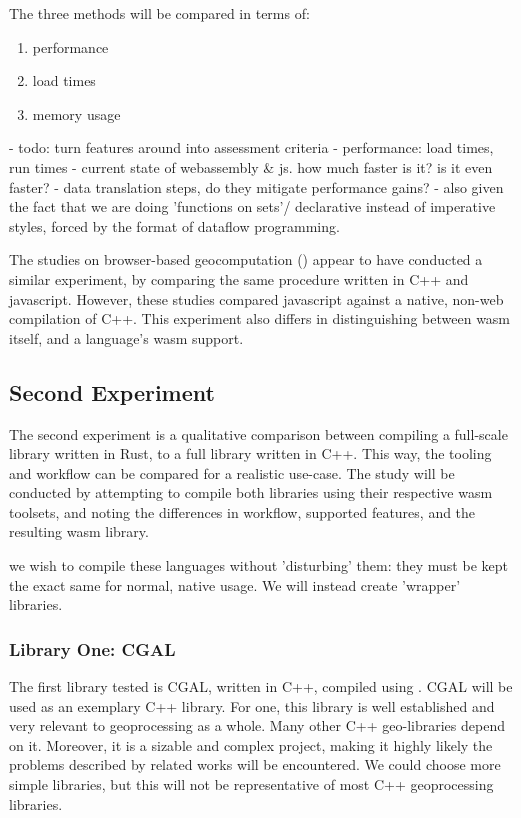 The three methods will be compared in terms of:
\begin{enumerate}[-]
  \item performance
  \item load times
  \item memory usage
\end{enumerate}

\begin{note}
  - todo: turn features around into assessment criteria
  - performance: load times, run times
  - current state of webassembly & js. how much faster is it? is it even faster? 
     - data translation steps, do they mitigate performance gains? 
     - also given the fact that we are doing 'functions on sets'/ declarative instead of imperative styles, forced by the format of dataflow programming. 
\end{note}

The studies on browser-based geocomputation () appear to have conducted a similar experiment, by comparing the same procedure written in C++ and javascript. 
However, these studies compared javascript against a native, non-web compilation of C++. 
This experiment also differs in distinguishing between \ac{wasm} itself, and a language's \ac{wasm} support.


\subsection{Second Experiment}
The second experiment is a qualitative comparison between compiling a full-scale library written in Rust, to a full library written in C++. 
This way, the tooling and workflow can be compared for a realistic use-case. 
The study will be conducted by attempting to compile both libraries using their respective \ac{wasm} toolsets, and noting the differences in workflow, supported features, and the resulting wasm library. 

we wish to compile these languages without 'disturbing' them: they must be kept the exact same for normal, native usage. 
We will instead create 'wrapper' libraries. 

\subsubsection*{Library One: CGAL}
The first library tested is CGAL, written in C++, compiled using .
CGAL will be used as an exemplary C++ library. 
For one, this library is well established and very relevant to geoprocessing as a whole. 
Many other C++ geo-libraries depend on it.
Moreover, it is a sizable and complex project, making it highly likely the problems described by related works will be encountered. 
We could choose more simple libraries, but this will not be representative of most C++ geoprocessing libraries. 

